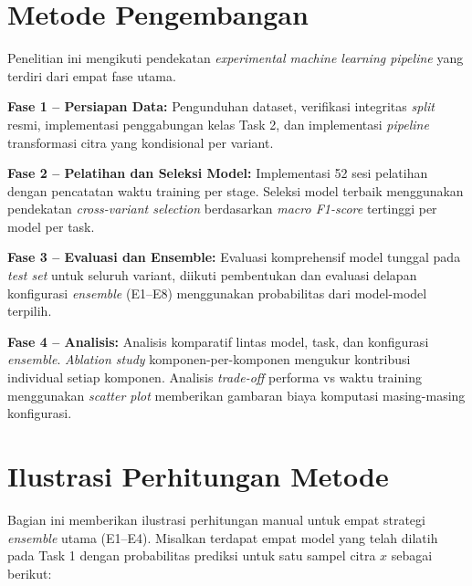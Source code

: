 \section{Metode Pengembangan} \label{III.Metode}
Penelitian ini mengikuti pendekatan \textit{experimental machine learning
pipeline} yang terdiri dari empat fase utama. \par

\textbf{Fase 1 -- Persiapan Data:} Pengunduhan dataset, verifikasi
integritas \textit{split} resmi, implementasi penggabungan kelas Task 2,
dan implementasi \textit{pipeline} transformasi citra yang kondisional
per variant. \par

\textbf{Fase 2 -- Pelatihan dan Seleksi Model:} Implementasi 52 sesi
pelatihan dengan pencatatan waktu training per stage. Seleksi model
terbaik menggunakan pendekatan \textit{cross-variant selection}
berdasarkan \textit{macro F1-score} tertinggi per model per task. \par

\textbf{Fase 3 -- Evaluasi dan Ensemble:} Evaluasi komprehensif model
tunggal pada \textit{test set} untuk seluruh variant, diikuti
pembentukan dan evaluasi delapan konfigurasi \textit{ensemble} (E1--E8)
menggunakan probabilitas dari model-model terpilih. \par

\textbf{Fase 4 -- Analisis:} Analisis komparatif lintas model, task, dan
konfigurasi \textit{ensemble}. \textit{Ablation study}
komponen-per-komponen mengukur kontribusi individual setiap komponen.
Analisis \textit{trade-off} performa vs waktu training menggunakan
\textit{scatter plot} memberikan gambaran biaya komputasi
masing-masing konfigurasi. \par


\section{Ilustrasi Perhitungan Metode} \label{III.Ilustrasi}
Bagian ini memberikan ilustrasi perhitungan manual untuk empat strategi
\textit{ensemble} utama (E1--E4). Misalkan terdapat empat model yang
telah dilatih pada Task 1 dengan probabilitas prediksi untuk satu sampel
citra $x$ sebagai berikut: \par

